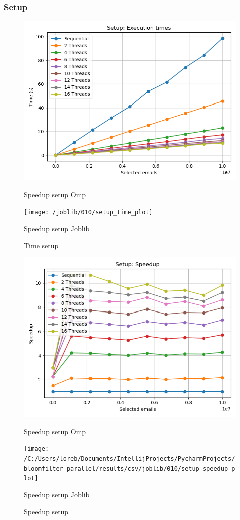 \documentclass[11pt]{article}
\begin{document}
    \subsubsection{Setup}\label{subsubsec:fpr-010-setup}
    \begin{figure}[H]
        \centering
        \includegraphics[width=\linewidth]{openmp/010/setup_times}
            \caption{Speedup setup Omp}\label{fig:010-setup_time_omp}
        \endminipage\hfill
        \texttt{[image: /joblib/010/setup\_time\_plot]}
            \caption{Speedup setup Joblib}\label{fig:010setup_time_joblib}
        \endminipage\hfill
        \caption{Time setup}
    \end{figure}
    \begin{figure}[H]
        \centering
        \includegraphics[width=\linewidth]{openmp/010/setup_speedup}
            \caption{Speedup setup Omp}\label{fig:010-setup_speedup_omp}
        \endminipage\hfill
        \texttt{[image: /C:/Users/loreb/Documents/IntellijProjects/PycharmProjects/bloomfilter\_parallel/results/csv/joblib/010/setup\_speedup\_plot]}
            \caption{Speedup setup Joblib}\label{fig:010-setup_speedup_joblib}
        \endminipage\hfill
        \caption{Speedup setup}
    \end{figure}
\end{document}
